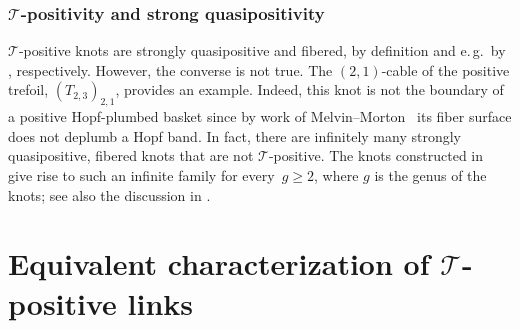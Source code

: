 \documentclass{amsart}
\theoremstyle{definition}
\newtheorem{example}[definition]{Example}
\theoremstyle{remark}
\theoremstyle{plain}
\newtheorem{question}[definition]{Question}%
\newcommand{\eg}{e.\,g.~}
\newcommand{\T}{\mathcal{T}}
\begin{document}


\subsubsection{\texorpdfstring{$\T$-positivity}{T-positivity} and strong quasipositivity}\label{T-pos_sqp}

$\T$-positive knots are strongly quasipositive and fibered, by definition and \eg by , respectively. However, the converse is not true. The $(2,1)$-cable of the positive trefoil, $(T_{2,3})_{2,1}$, provides an example.
Indeed, this knot is not the boundary of a positive Hopf-plumbed basket since by work of Melvin--Morton~\cite{melvin_morton} its fiber surface does not deplumb a Hopf band. 
In fact, there are infinitely many strongly quasipositive, fibered knots that are not $\T$-positive. The knots constructed in~\cite{misev} give rise to such an infinite family for every~$g \geq 2$, where $g$ is the genus of the knots; see also the discussion in .

\newpage

\section{Equivalent characterization of \texorpdfstring{$\T$-positive}{T-positive} links}\label{sec:characterisations}
\end{document}
